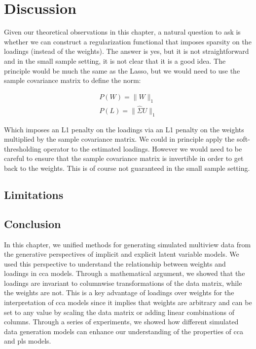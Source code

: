 \section{Discussion}

Given our theoretical observations in this chapter, a natural question to ask is whether we can construct a regularization functional that imposes sparsity on the \gls{loadings} (instead of the weights).
The answer is yes, but it is not straightforward and in the small sample setting, it is not clear that it is a good idea.
The principle would be much the same as the Lasso, but we would need to use the sample covariance matrix to define the norm:

\begin{align}
    P(W)=\|W\|_1 \\
    P(L)=\|\hat{\Sigma}U\|_1
\end{align}

Which imposes an L1 penalty on the \gls{loadings} via an L1 penalty on the \gls{weights} multiplied by the sample covariance matrix.
We could in principle apply the soft-thresholding operator to the estimated loadings.
However we would need to be careful to ensure that the sample covariance matrix is invertible in order to get back to the weights.
This is of course not guaranteed in the small sample setting.

\subsection{Limitations}



\subsection{Conclusion}

In this chapter, we unified methods for generating simulated multiview data from the generative perspectives of implicit and explicit latent variable models.
We used this perspective to understand the relationship between weights and loadings in \acrshort{cca} models.
Through a mathematical argument, we showed that the \gls{loadings} are invariant to columnwise transformations of the data matrix, while the weights are not.
This is a key advantage of \gls{loadings} over weights for the interpretation of \acrshort{cca} models since it implies that weights are arbitrary and can be set to any value by scaling the data matrix or adding linear combinations of columns.
Through a series of experiments, we showed how different simulated data generation models can enhance our understanding of the properties of \acrshort{cca} and \acrshort{pls} models.